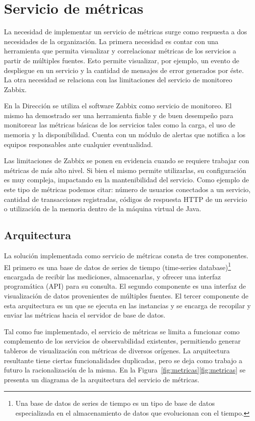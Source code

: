 \section{Servicio de métricas}

La necesidad de implementar un servicio de métricas surge como
respuesta a dos necesidades de la organización. La primera necesidad
es contar con una herramienta que permita visualizar y correlacionar
métricas de los servicios a partir de múltiples fuentes. Esto permite
visualizar, por ejemplo, un evento de despliegue en un servicio y la
cantidad de mensajes de error generados por éste. La otra necesidad se
relaciona con las limitaciones del servicio de monitoreo Zabbix.

En la Dirección se utiliza el software Zabbix como servicio de
monitoreo. El mismo ha demostrado ser una herramienta fiable y de buen
desempeño para monitorear las métricas básicas de los servicios tales
como la carga, el uso de memoria y la disponibilidad. Cuenta con un
módulo de alertas que notifica a los equipos responsables ante
cualquier eventualidad.

Las limitaciones de Zabbix se ponen en evidencia cuando se requiere
trabajar con métricas de más alto nivel. Si bien el mismo permite
utilizarlas, su configuración es muy compleja, impactando en la
mantenibilidad del servicio. Como ejemplo de este tipo de métricas
podemos citar: número de usuarios conectados a un servicio, cantidad
de transacciones registradas, códigos de respuesta HTTP de un servicio
o utilización de la memoria  dentro de la máquina virtual
de Java.

\subsection{Arquitectura}

La solución implementada como servicio de métricas consta de tres
componentes. El primero es una base de datos de series de tiempo
(time-series database)\footnote{ Una base de datos de series de tiempo
  es un tipo de base de datos especializada en el almacenamiento de
  datos que evolucionan con el tiempo. } encargada de recibir las
mediciones, almacenarlas, y ofrecer una interfaz programática (API)
para su consulta. El segundo componente es una interfaz de
visualización de datos provenientes de múltiples fuentes. El tercer
componente de esta arquitectura es un  que se ejecuta
en las instancias y se encarga de recopilar y enviar las métricas
hacia el servidor de base de datos.

Tal como fue implementado, el servicio de métricas se limita a
funcionar como complemento de los servicios de observabilidad
existentes, permitiendo generar tableros de visualización con métricas
de diversos orígenes. La arquitectura resultante tiene ciertas
funcionalidades duplicadas, pero se deja como trabajo a futuro la
racionalización de la misma. En la
\iflatexml{}Figura~\ref{fig:metricas}\else\autoref{fig:metricas}\fi{}
se presenta un diagrama de la arquitectura del servicio de métricas.

